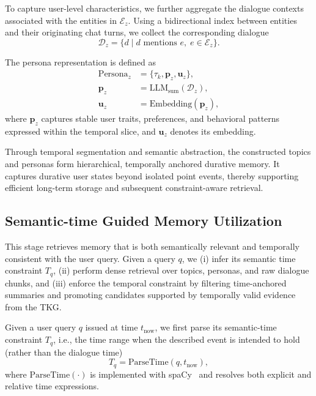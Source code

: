 \documentclass[11pt]{article}
\begin{document}
To capture user-level characteristics, we further aggregate the dialogue contexts associated with the entities in $\mathcal{E}_z$. Using a bidirectional index between entities and their originating chat turns, we collect the corresponding dialogue
\begin{equation}
\mathcal{D}_z = \{ d \mid d \text{ mentions } e,\; e \in \mathcal{E}_z \}.
\end{equation}

The persona representation is defined as
\begin{equation}
\begin{aligned}
\mathrm{Persona}_z &= \{ \tau_k, \mathbf{p}_z, \mathbf{u}_z \}, \\
\mathbf{p}_z &= \mathrm{LLM}_{\mathrm{sum}}(\mathcal{D}_z), \\
\mathbf{u}_z &= \mathrm{Embedding}(\mathbf{p}_z),
\end{aligned}
\end{equation}
where $\mathbf{p}_z$ captures stable user traits, preferences, and behavioral patterns expressed within the temporal slice, and $\mathbf{u}_z$ denotes its embedding.

Through temporal segmentation and semantic abstraction, the constructed topics and personas form hierarchical, temporally anchored durative memory. It captures durative user states beyond isolated point events, thereby supporting efficient long-term storage and subsequent constraint-aware retrieval.


\subsection{Semantic-time Guided Memory Utilization}
\label{sec:retrieval}
This stage retrieves memory that is both semantically relevant and temporally consistent with the user query. Given a query $q$, we (i) infer its semantic time constraint $T_q$, (ii) perform dense retrieval over topics, personas, and raw dialogue chunks, and (iii) enforce the temporal constraint by filtering time-anchored summaries and promoting candidates supported by temporally valid evidence from the TKG.

Given a user query $q$ issued at time $t_{\mathrm{now}}$, we first parse its semantic-time constraint $T_q$, i.e., the time range when the described event is intended to hold (rather than the dialogue time)
\begin{equation}
T_q = \mathrm{ParseTime}(q, t_{\mathrm{now}}),
\end{equation}
where $\mathrm{ParseTime}(\cdot)$ is implemented with spaCy~\cite{Honnibal2020spaCy} and resolves both explicit and relative time expressions.
\end{document}
